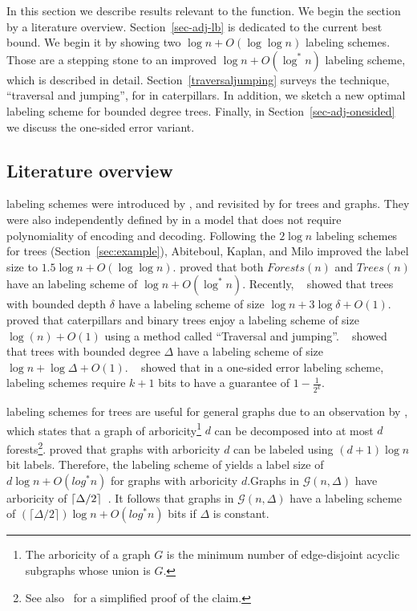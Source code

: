 	In this section we describe results relevant to the \adjacency function.
	We begin the section by a literature overview. 
	Section~\ref{sec-adj-lb} is dedicated to the current best bound.
	We begin it by showing two  $\log n + O( \log \log n)$ \adjacency labeling schemes.
	Those are a stepping stone to an improved $\log n+O(\log^* n)$ labeling scheme, which is described in detail.
	 Section~\ref{traversaljumping} surveys the technique, ``traversal and jumping'', for \adjacency in  caterpillars.
	 In addition, we sketch a new optimal labeling scheme for bounded degree trees.
	 Finally, in Section~\ref{sec-adj-onesided} we discuss the one-sided error variant.
\subsection{Literature overview}
	\adjacency labeling schemes were introduced by , and revisited by  for trees and graphs.
	They were also independently defined by  in a model that does not require polynomiality of encoding and decoding.
	Following the $2 \log n$ \adjacency labeling schemes for trees (Section~\ref{sec:example}), Abiteboul, Kaplan, and Milo  improved the label size to $1.5 \log n+O(\log \log n)$.
	 proved that both $Forests(n)$ and $Trees(n)$ have an \adjacency  labeling scheme of $\log n +O(\log^*n)$.
	Recently, ~ showed  that trees with bounded depth $\delta$ have a labeling scheme of size $\log n+ 3\log \delta +O(1)$.
  proved that caterpillars and binary trees enjoy a labeling scheme of size $\log(n)+O(1)$ using a method called ``Traversal and jumping''.
	~ showed that trees with bounded degree $\Delta$ have a labeling scheme of size $\log n + \log \Delta + O(1)$.  
		~  showed that in a one-sided error labeling scheme, \nonadjacency labeling schemes require $k+1$ bits to have a guarantee of $1-\frac{1}{2^k}$.
		
	\adjacency labeling schemes for trees are useful for general graphs due to an observation  by 	
	, which states that a graph of arboricity\footnote{The arboricity of a graph $G$  is the minimum number of edge-disjoint acyclic subgraphs whose union is $G$.
}  $d$  can be decomposed into  at most $d$ forests\footnote{See also~\cite{chen1994short} for a simplified proof of the claim.}.  proved that graphs with arboricity $d$ can be labeled using $(d+1) \log n$ bit labels.
	Therefore, the labeling scheme of   yields a label size of $d\log n +O(log^* n)$ for graphs with arboricity $d$.Graphs in $\mathcal{G}(n,\Delta)$ have arboricity of $\left\lceil{ \Delta  / 2}\right\rceil $~\cite{Kannan92}.
	It follows that graphs in $\mathcal{G}(n,\Delta)$  have a labeling scheme of  $(\lceil \Delta  / 2 \rceil) \log n  +O(log^* n) $ bits if $\Delta$ is constant.


